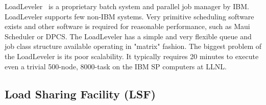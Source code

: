 LoadLeveler~\cite{LoadLevelerManual,LoadLevelerWeb} 
is a proprietary batch system and parallel job manager by 
IBM. LoadLeveler supports few non-IBM systems. Very primitive 
scheduling software exists and other software is required for reasonable 
performance, such as Maui Scheduler or DPCS. 
The LoadLeveler has a  simple and very flexible queue and job class structure available 
operating in "matrix" fashion. 
The biggest problem of the LoadLeveler is its poor scalability. 
It typically requires 20 minutes to execute even a trivial 500-node, 8000-task
on the IBM SP computers at LLNL.
%
%
%
%
\subsection*{Load Sharing Facility (LSF)}

